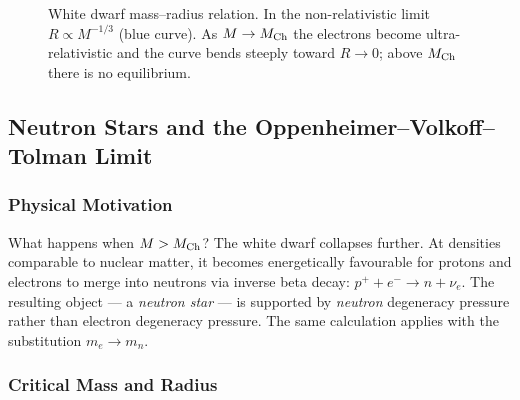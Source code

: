 \begin{figure}[ht]
    \centering
    \caption{White dwarf mass--radius relation. In the non-relativistic limit
    $R\propto M^{-1/3}$ (blue curve). As $M\to M_{\rm Ch}$ the electrons
    become ultra-relativistic and the curve bends steeply toward $R\to0$;
    above $M_{\rm Ch}$ there is no equilibrium.}
    \label{fig:lec10:wd-rm}
\end{figure}

\subsection{Neutron Stars and the Oppenheimer--Volkoff--Tolman Limit}
\label{sec:lec10:neutron-stars}

\subsubsection*{Physical Motivation}
What happens when $M>M_{\rm Ch}$? The white dwarf collapses further. At
densities comparable to nuclear matter, it becomes energetically favourable for
protons and electrons to merge into neutrons via inverse beta decay:
$p^+ + e^- \to n + \nu_e$. The resulting object --- a \emph{neutron star} --- is
supported by \emph{neutron} degeneracy pressure rather than electron degeneracy
pressure. The same calculation applies with the substitution $m_e\to m_n$.

\subsubsection*{Critical Mass and Radius}


